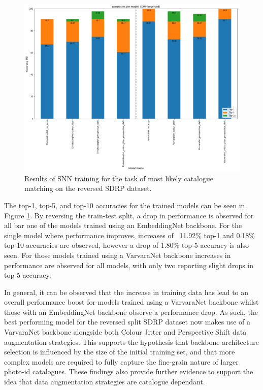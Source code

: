  \begin{figure}
 	\begin{center}
 		\includegraphics[scale=0.4]{Chapter6/figs/SDRP-reversed-split-model-comparison.png}
 	\end{center}
 	\caption{Results of SNN training for the task of most likely catalogue matching on the reversed SDRP dataset.}
 	\label{fig:SDRP-reversed-split-model-comparison}
 \end{figure}

The top-1, top-5, and top-10 accuracies for the trained models can be seen in Figure \ref{fig:SDRP-reversed-split-model-comparison}. By reversing the train-test split, a drop in performance is observed for all bar one of the models trained using an EmbeddingNet backbone. For the single model where performance improves, increases of  11.92\% top-1 and 0.18\%  top-10 accuracies are observed, however a drop of 1.80\% top-5 accuracy is also seen. For those models trained using a VarvaraNet backbone increases in performance are observed for all models, with only two reporting slight drops in top-5 accuracy. 

In general, it can be observed that the increase in training data has lead to an overall performance boost for models trained using a VarvaraNet backbone whilst those with an EmbeddingNet backbone observe a performance drop. As such, the best performing model for the reversed split SDRP dataset now makes use of a VarvaraNet backbone alongside both Colour Jitter and Perspective Shift data augmentation strategies. This supports the hypothesis that backbone architecture selection is influenced by the size of the initial training set, and that more complex models are required to fully capture the fine-grain nature of larger photo-id catalogues. These findings also provide further evidence to support the idea that data augmentation strategies are catalogue dependant. 

